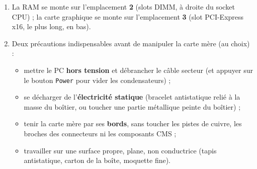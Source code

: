 \documentclass[11pt]{article}
\begin{document}
\begin{corrige}
\begin{enumerate}
  \item La RAM se monte sur l'emplacement \textbf{2} (slots DIMM, à droite du socket CPU) ; la carte graphique se monte sur l'emplacement \textbf{3} (slot PCI-Express x16, le plus long, en bas).
  \item Deux précautions indispensables avant de manipuler la carte mère (au choix) :
  \begin{itemize}
    \item mettre le PC \textbf{hors tension} et débrancher le câble secteur (et appuyer sur le bouton \texttt{Power} pour vider les condensateurs) ;
    \item se décharger de l'\textbf{électricité statique} (bracelet antistatique relié à la masse du boîtier, ou toucher une partie métallique peinte du boîtier) ;
    \item tenir la carte mère par ses \textbf{bords}, sans toucher les pistes de cuivre, les broches des connecteurs ni les composants CMS ;
    \item travailler sur une surface propre, plane, non conductrice (tapis antistatique, carton de la boîte, moquette fine).
  \end{itemize}
\end{enumerate}
\end{corrige}
\end{document}
